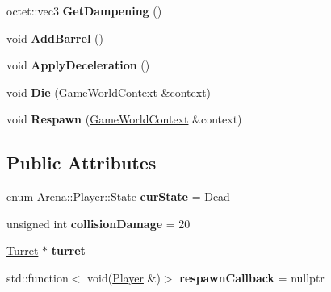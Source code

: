 \begin{DoxyCompactItemize}
\item 
\hypertarget{class_arena_1_1_player_a37328c92147483bbbed26c9510767630}{octet\+::vec3 {\bfseries Get\+Dampening} ()}\label{class_arena_1_1_player_a37328c92147483bbbed26c9510767630}

\item 
\hypertarget{class_arena_1_1_player_aa909d09aeec8fdfff91e8560157604f9}{void {\bfseries Add\+Barrel} ()}\label{class_arena_1_1_player_aa909d09aeec8fdfff91e8560157604f9}

\item 
\hypertarget{class_arena_1_1_player_acd5c1127e541903daf6de6e493f395c2}{void {\bfseries Apply\+Deceleration} ()}\label{class_arena_1_1_player_acd5c1127e541903daf6de6e493f395c2}

\item 
\hypertarget{class_arena_1_1_player_a36b05e4e889e2c4cf3b4b32f9e8ad6e8}{void {\bfseries Die} (\hyperlink{struct_arena_1_1_game_world_context}{Game\+World\+Context} \&context)}\label{class_arena_1_1_player_a36b05e4e889e2c4cf3b4b32f9e8ad6e8}

\item 
\hypertarget{class_arena_1_1_player_aca494aed5b70e78c31f68f6046f95fb2}{void {\bfseries Respawn} (\hyperlink{struct_arena_1_1_game_world_context}{Game\+World\+Context} \&context)}\label{class_arena_1_1_player_aca494aed5b70e78c31f68f6046f95fb2}

\end{DoxyCompactItemize}
\subsection*{Public Attributes}
\begin{DoxyCompactItemize}
\item 
\hypertarget{class_arena_1_1_player_ae8b0acc9c546a21e20c705e40a64ee29}{enum Arena\+::\+Player\+::\+State {\bfseries cur\+State} = Dead}\label{class_arena_1_1_player_ae8b0acc9c546a21e20c705e40a64ee29}

\item 
\hypertarget{class_arena_1_1_player_a8e9ca1b2e58fd3ab80e410b5dee3ba37}{unsigned int {\bfseries collision\+Damage} = 20}\label{class_arena_1_1_player_a8e9ca1b2e58fd3ab80e410b5dee3ba37}

\item 
\hypertarget{class_arena_1_1_player_a0adc096e775af7e9b69d8ba21cc279b9}{\hyperlink{class_arena_1_1_turret}{Turret} $\ast$ {\bfseries turret}}\label{class_arena_1_1_player_a0adc096e775af7e9b69d8ba21cc279b9}

\item 
\hypertarget{class_arena_1_1_player_a35d3903e1a32c8fb3591787b91a14080}{std\+::function$<$ void(\hyperlink{class_arena_1_1_player}{Player} \&)$>$ {\bfseries respawn\+Callback} = nullptr}\label{class_arena_1_1_player_a35d3903e1a32c8fb3591787b91a14080}

\end{DoxyCompactItemize}

